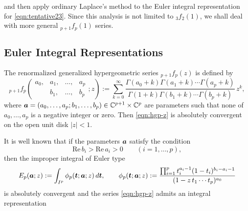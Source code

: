 \documentclass[a4paper,12pt]{article}
\theoremstyle{plain}
\def\rRe{\mathrm{Re}}
\def\C{\mathbb{C}}
\def\vG{\varGamma}
\def\ba{\mbox{\boldmath $a$}}
\def\bt{\mbox{\boldmath $t$}}
\begin{document}
and then apply ordinary Laplace's method to the Euler integral 
representation for \eqref{eqn:tentative23}. 
Since this analysis is not limited to ${}_3f_2(1)$, 
we shall deal with more general ${}_{p+1}f_p(1)$ series.         
\subsection{Euler Integral Representations} \label{subsec:eir}
The renormalized generalized hypergeometric series ${}_{p+1}f_p(z)$ 
is defined by 
\begin{equation} \label{eqn:hgp-z}
{}_{p+1}f_p\left(
\begin{matrix}
a_0, & a_1, & \dots, & a_p \\
     & b_1, & \dots, & b_p 
\end{matrix}
; z \right) := 
\sum_{k=0}^{\infty} \dfrac{\vG(a_0+k) \vG(a_1+k) \cdots 
\vG(a_p+k)}{\vG(1+k) \vG(b_1+k) \cdots \vG(b_p+k)} \, z^k, 
\end{equation}
where $\ba = (a_0, \dots, a_p; b_1, \dots, b_p) \in \C^{p+1} 
\times \C^p$ are parameters such that none of $a_0, \dots, a_p$ 
is a negative integer or zero. 
Then \eqref{eqn:hgp-z} is absolutely convergent on the open unit 
disk $|z| < 1$. 
\par
It is well known that if the parameters $\ba$ satisfy the condition  
\begin{equation} \label{eqn:bba} 
\rRe \, b_i > \rRe \, a_i > 0 \qquad (i = 1, \dots, p),   
\end{equation}
then the improper integral of Euler type  
\begin{equation*} 
E_p(\ba ; z) 
:= \int_{I^p} \phi_p( \bt ; \ba ; z) \, d \bt, \qquad    
\phi_p( \bt ; \ba ; z) 
:=\dfrac{ \prod_{i=1}^p 
t_i^{a_i-1} (1-t_i)^{b_i-a_i-1}}{ (1- z \, t_1 \cdots t_p)^{a_0} } 
\end{equation*}
is absolutely convergent and the series \eqref{eqn:hgp-z} admits an 
integral representation 
\end{document}

